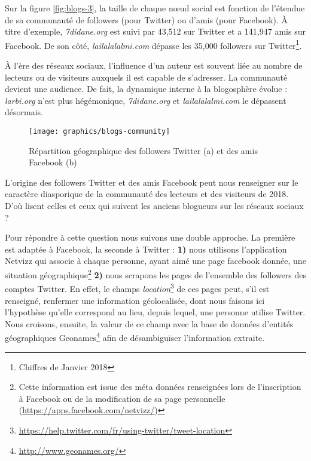 \documentclass[symmetric,justified,marginals=raggedouter]{tufte-book}
\begin{document}
\noindent Sur la figure \ref{fig:blogs-3}, la taille de chaque nœud social est fonction de l'étendue de sa communauté de followers (pour Twitter) ou d'amis (pour Facebook). À titre d'exemple, \textit{7didane.org} est suivi par 43,512 sur Twitter et a 141,947 amis sur Facebook. De son côté, \textit{lailalalalmi.com}  dépasse les 35,000 followers sur Twitter\footnote{Chiffres de Janvier 2018}.

À l'ère des réseaux sociaux, l'influence d'un auteur est souvent liée au nombre de lecteurs ou de visiteurs auxquels il est capable de s'adresser. La communauté devient une audience. De fait, la dynamique interne à la blogosphère évolue : \textit{larbi.org} n'est plus hégémonique, \textit{7didane.org} et \textit{lailalalalmi.com} le dépassent désormais.

\begin{figure*}
  \texttt{[image: graphics/blogs-community]}
  \caption{Répartition géographique des followers Twitter (a) et des amis Facebook (b)}
  \label{fig:blogs-community}
\end{figure*} 

\noindent L'origine des followers Twitter et des amis Facebook peut nous renseigner sur le caractère diasporique de la communauté des lecteurs et des visiteurs de 2018. D'où lisent celles et ceux qui suivent les anciens blogueurs sur les réseaux sociaux ?

\noindent Pour répondre à cette question nous suivons une double approche. La première est adaptée à Facebook, la seconde à Twitter : \textbf{1)} nous utilisons l'application Netvizz qui associe à chaque personne, ayant aimé une page facebook donnée, une situation géographique\footnote{Cette information est issue des méta données renseignées lors de l'inscription à Facebook ou de la modification de sa page personnelle (\url{https://apps.facebook.com/netvizz/})} \textbf{2)} nous scrapons les pages de l'ensemble des followers des comptes Twitter. En effet, le champs \textit{location}\footnote{\url{https://help.twitter.com/fr/using-twitter/tweet-location}} de ces pages peut, s'il est renseigné, renfermer une information géolocalisée, dont nous faisons ici l'hypothèse qu'elle correspond au lieu, depuis lequel, une personne utilise Twitter. Nous croisons, ensuite, la valeur de ce champ avec la base de données d'entités géographiques Geonames\footnote{\url{http://www.geonames.org/}} afin de désambiguïser l'information extraite. 
\end{document}
